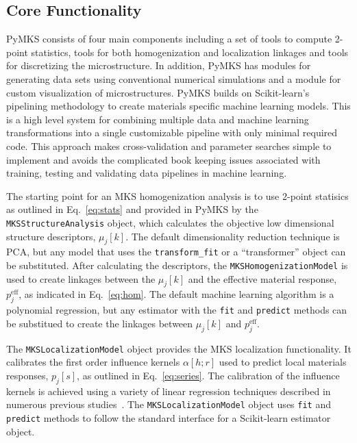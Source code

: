 \documentclass{bmcart}
\begin{document}
\subsection{Core Functionality}


PyMKS consists of four main components including a set of tools to
compute 2-point statistics, tools for both homogenization and
localization linkages and tools for discretizing the microstructure. In
addition, PyMKS has modules for generating data sets using
conventional numerical simulations and a module for custom
visualization of microstructures. PyMKS builds on Scikit-learn's
pipelining methodology to create materials specific machine learning
models. This is a high level system for combining
multiple data and machine learning transformations into a single
customizable pipeline with only minimal required code. This approach
makes cross-validation and parameter searches simple to implement and
avoids the complicated book keeping issues associated with training,
testing and validating data pipelines in machine learning.

The starting point for an MKS homogenization analysis is to use
2-point statisics as outlined in Eq.~\ref{eq:stats} and provided in
PyMKS by the \texttt{MKSStructureAnalysis} object, which calculates
the objective low dimensional structure descriptors, $\mu_j[k]$. The
default dimensionality reduction technique is PCA, but any model that
uses the \texttt{transform\_fit} or a ``transformer'' object can be
substituted. After calculating the descriptors, the
\texttt{MKSHomogenizationModel} is used to create linkages between the
$\mu_j[k]$ and the effective material response, $p_j^{\text{eff}}$,
as indicated in Eq.~\ref{eq:hom}. The default machine learning
algorithm is a polynomial regression, but any estimator with the
\texttt{fit} and \texttt{predict} methods can be substitued to create
the linkages between $\mu_j[k]$ and $p_j^{\text{eff}}$.

The \texttt{MKSLocalizationModel} object provides the MKS localization
functionality. It calibrates the first order influence kernels
$\alpha[h; r]$ used to predict local materials responses, $p_j[s]$, as
outlined in Eq.~\ref{eq:series}. The calibration of the influence
kernels is achieved using a variety of linear regression techniques
described in numerous previous studies~\cite{landi2010multi,
kalidindi2010novel, yabansu2014calibrated, brough2016microstructure}.
The \texttt{MKSLocalizationModel} object uses \texttt{fit} and
\texttt{predict} methods to follow the standard interface for a
Scikit-learn estimator object.
\end{document}
